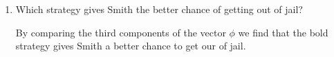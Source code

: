 \begin{enumerate}[label=\alph*)]
\item
Which strategy gives Smith the better chance of getting out of jail?
\begin{solution}[0.5cm]
By comparing the third components of the vector $\phi$ we find that 
the bold strategy gives Smith a better chance to get our of jail.
\end{solution}
\end{enumerate}